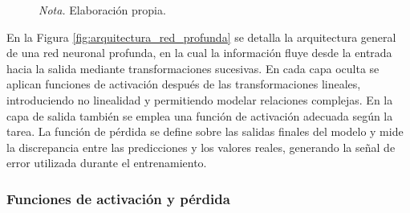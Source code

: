 \begin{figure}[h]
    
    \vspace{0.2cm}
    \caption*{\normalfont\normalsize\textit{Nota.} Elaboración propia.}
\end{figure}

En la Figura \ref{fig:arquitectura_red_profunda} se detalla la arquitectura general de una red neuronal profunda, en la cual la información fluye desde la entrada hacia la salida mediante transformaciones sucesivas. En cada capa oculta se aplican funciones de activación después de las transformaciones lineales, introduciendo no linealidad y permitiendo modelar relaciones complejas. En la capa de salida también se emplea una función de activación adecuada según la tarea. La función de pérdida se define sobre las salidas finales del modelo y mide la discrepancia entre las predicciones y los valores reales, generando la señal de error utilizada durante el entrenamiento.

\subsubsection{Funciones de activación y pérdida}


